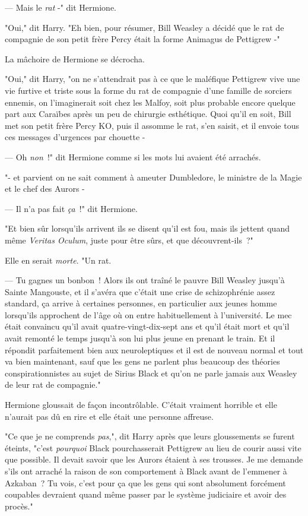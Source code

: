--- Mais le \emph{rat} -" dit Hermione.

"Oui," dit Harry. "Eh bien, pour résumer, Bill Weasley a décidé que le rat de compagnie de son petit frère Percy était la forme Animagus de Pettigrew -"

La mâchoire de Hermione se décrocha.

"Oui," dit Harry, "on ne s'attendrait pas à ce que le maléfique Pettigrew vive une vie furtive et triste sous la forme du rat de compagnie d'une famille de sorciers ennemis, on l'imaginerait soit chez les Malfoy, soit plus probable encore quelque part aux Caraïbes après un peu de chirurgie esthétique. Quoi qu'il en soit, Bill met son petit frère Percy KO, puis il assomme le rat, s'en saisit, et il envoie tous ces messages d'urgences par chouette -

--- Oh \emph{non}~!" dit Hermione comme si les mots lui avaient été arrachés.

"- et parvient on ne sait comment à ameuter Dumbledore, le ministre de la Magie et le chef des Aurors -

--- Il n'a pas fait \emph{ça}~!" dit Hermione.

"Et bien sûr lorsqu'ils arrivent ils se disent qu'il est fou, mais ils jettent quand même \emph{Veritas Oculum}, juste pour être sûrs, et que découvrent-ils~?"

Elle en serait \emph{morte}. "Un rat.

--- Tu gagnes un bonbon~! Alors ils ont traîné le pauvre Bill Weasley jusqu'à Sainte Mangouste, et il s'avéra que c'était une crise de schizophrénie assez standard, ça arrive à certaines personnes, en particulier aux jeunes homme lorsqu'ils approchent de l'âge où on entre habituellement à l'université. Le mec était convaincu qu'il avait quatre-vingt-dix-sept ans et qu'il était mort et qu'il avait remonté le temps jusqu'à son lui plus jeune en prenant le train. Et il répondit parfaitement bien aux neuroleptiques et il est de nouveau normal et tout va bien maintenant, sauf que les gens ne parlent plus beaucoup des théories conspirationnistes au sujet de Sirius Black et qu'on ne parle jamais aux Weasley de leur rat de compagnie."

Hermione gloussait de façon incontrôlable. C'était vraiment horrible et elle n'aurait pas dû en rire et elle était une personne affreuse.

"Ce que je ne comprends \emph{pas},", dit Harry après que leurs gloussements se furent éteints, "c'est \emph{pourquoi} Black pourchasserait Pettigrew au lieu de courir aussi vite que possible. Il devait savoir que les Aurors étaient à ses trousses. Je me demande s'ils ont arraché la raison de son comportement à Black avant de l'emmener à Azkaban~? Tu vois, c'est pour ça que les gens qui sont absolument forcément coupables devraient quand même passer par le système judiciaire et avoir des procès."


